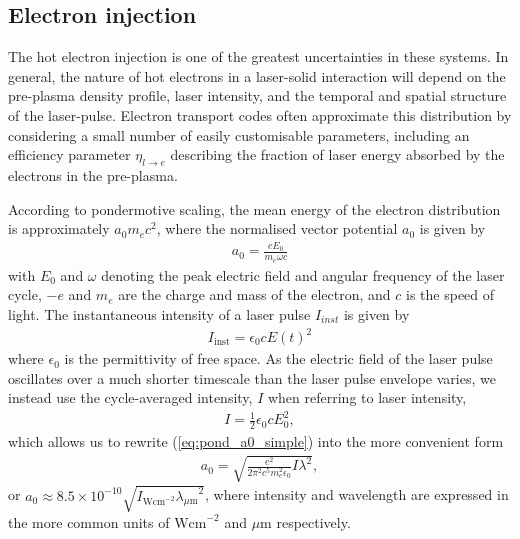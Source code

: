 \documentclass[12pt]{article}
\numberwithin{equation}{section}
\begin{document}
\subsection{Electron injection} \label{sec:theory:inject}

The hot electron injection is one of the greatest uncertainties in these systems. In general, the nature of hot electrons in a laser-solid interaction will depend on the pre-plasma density profile, laser intensity, and the temporal and spatial structure of the laser-pulse. Electron transport codes often approximate this distribution by considering a small number of easily customisable parameters, including an efficiency parameter $\eta_{l\rightarrow e}$ describing the fraction of laser energy absorbed by the electrons in the pre-plasma.

According to pondermotive scaling, the mean energy of the electron distribution is approximately $a_0 m_e c^2$, where the normalised vector potential $a_0$ is given by
\begin{align} \label{eq:pond_a0_simple}
	a_0 = \frac{eE_0}{m_e\omega c} 
\end{align}
with $E_0$ and $\omega$ denoting the peak electric field and angular frequency of the laser cycle, $-e$ and $m_e$ are the charge and mass of the electron, and $c$ is the speed of light. The instantaneous intensity of a laser pulse $I_{inst}$ is given by
\begin{align}
	I_\text{inst} = \epsilon_0 c E(t)^2 
\end{align}
where $\epsilon_0$ is the permittivity of free space. As the electric field of the laser pulse oscillates over a much shorter timescale than the laser pulse envelope varies, we instead use the cycle-averaged intensity, $I$ when referring to laser intensity,
\begin{align} 
	I = \frac{1}{2} \epsilon_0 c E_0^2, 
\end{align} 
which allows us to rewrite (\ref{eq:pond_a0_simple}) into the more convenient form
\begin{align} \label{eq:full_a0}
	a_0 = \sqrt{\frac{e^2}{2\pi^2 c^5 m_e^2 \epsilon_0} I\lambda^2},
\end{align}
or $a_0\approx 8.5\times 10^{-10}\sqrt{I_{\text{Wcm}^{-2}}{\lambda_{\mu \text{m}}}^2}$, where intensity and wavelength are expressed in the more common units of $\text{Wcm}^{-2}$ and $\mu\text{m}$ respectively.
\end{document}
